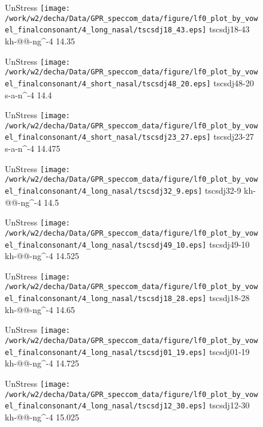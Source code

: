 \documentclass{article}
\begin{document}
\begin{figure}[t]
\begin{minipage}[b]{.24\textwidth}
UnStress
\centering
\texttt{[image: /work/w2/decha/Data/GPR\_speccom\_data/figure/lf0\_plot\_by\_vowel\_finalconsonant/4\_long\_nasal/tscsdj18\_43.eps]}
tscsdj18-43 kh-@@-ng\textasciicircum-4 14.35
\end{minipage}
\begin{minipage}[b]{.24\textwidth}
UnStress
\centering
\texttt{[image: /work/w2/decha/Data/GPR\_speccom\_data/figure/lf0\_plot\_by\_vowel\_finalconsonant/4\_short\_nasal/tscsdj48\_20.eps]}
tscsdj48-20 s-a-n\textasciicircum-4 14.4
\end{minipage}
\begin{minipage}[b]{.24\textwidth}
UnStress
\centering
\texttt{[image: /work/w2/decha/Data/GPR\_speccom\_data/figure/lf0\_plot\_by\_vowel\_finalconsonant/4\_short\_nasal/tscsdj23\_27.eps]}
tscsdj23-27 s-a-n\textasciicircum-4 14.475
\end{minipage}
\begin{minipage}[b]{.24\textwidth}
UnStress
\centering
\texttt{[image: /work/w2/decha/Data/GPR\_speccom\_data/figure/lf0\_plot\_by\_vowel\_finalconsonant/4\_long\_nasal/tscsdj32\_9.eps]}
tscsdj32-9 kh-@@-ng\textasciicircum-4 14.5
\end{minipage}
\end{figure}
\clearpage
\begin{figure}[t]
\begin{minipage}[b]{.24\textwidth}
UnStress
\centering
\texttt{[image: /work/w2/decha/Data/GPR\_speccom\_data/figure/lf0\_plot\_by\_vowel\_finalconsonant/4\_long\_nasal/tscsdj49\_10.eps]}
tscsdj49-10 kh-@@-ng\textasciicircum-4 14.525
\end{minipage}
\begin{minipage}[b]{.24\textwidth}
UnStress
\centering
\texttt{[image: /work/w2/decha/Data/GPR\_speccom\_data/figure/lf0\_plot\_by\_vowel\_finalconsonant/4\_long\_nasal/tscsdj18\_28.eps]}
tscsdj18-28 kh-@@-ng\textasciicircum-4 14.65
\end{minipage}
\begin{minipage}[b]{.24\textwidth}
UnStress
\centering
\texttt{[image: /work/w2/decha/Data/GPR\_speccom\_data/figure/lf0\_plot\_by\_vowel\_finalconsonant/4\_long\_nasal/tscsdj01\_19.eps]}
tscsdj01-19 kh-@@-ng\textasciicircum-4 14.725
\end{minipage}
\begin{minipage}[b]{.24\textwidth}
UnStress
\centering
\texttt{[image: /work/w2/decha/Data/GPR\_speccom\_data/figure/lf0\_plot\_by\_vowel\_finalconsonant/4\_long\_nasal/tscsdj12\_30.eps]}
tscsdj12-30 kh-@@-ng\textasciicircum-4 15.025
\end{minipage}
\end{figure}
\end{document}
